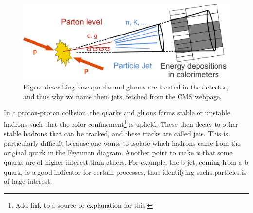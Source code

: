 \begin{figure}[h!]
    \includegraphics[width=\linewidth]{Figures/atlas/cms_Sketch_PartonParticleCaloJet.png}
    \caption{Figure describing how quarks and gluons are treated in the detector, and thus why we name them jets, fetched from \href{https://cms.cern/sites/default/files/field/image/Sketch_PartonParticleCaloJet.png}{the CMS webpage}. }
    \label{fig:cms_jets}
\end{figure}

In a proton-proton collision, the quarks and gluons forms stable or unstable hadrons such that the color confinement\footnote{Add link to a source or explanation for this.} is upheld. These then 
decay to other stable hadrons that can be tracked, and these tracks are called jets. This is particularly difficult because one wants to isolate which hadrons came from  the original quark in the 
Feynman diagram. Another point to make is that some quarks are of higher interest than others. For example, the b jet, coming from a b quark, is a good indicator for certain processes, 
thus identifying suchs particles is of huge interest. 